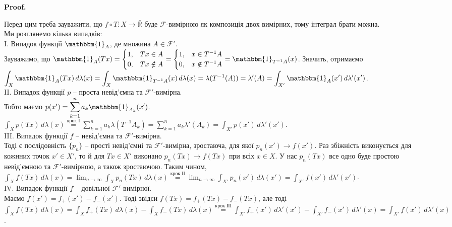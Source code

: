 \documentclass[a4paper, 10pt]{article}
\makeatletter
\theoremstyle{theoremdd}
\renewenvironment{proof}[1][Proof.\\]{\par
\pushQED{\hfill \qed}%
\normalfont \topsep6\p@\@plus6\p@\relax
\trivlist
\item\relax
{\bfseries
#1\@addpunct{.}}\hspace\labelsep\ignorespaces
}{%
\popQED\endtrivlist\@endpefalse
}
\makeatother
\begin{document}
\begin{proof}
Перед цим треба зауважити, що $f \circ T \colon X \to \bar{\mathbb{R}}$ буде $\mathcal{F}$-вимірною як композиція двох вимірних, тому інтеграл брати можна.\\
Ми розглянемо кілька випадків:\\
I. Випадок функції $\mathbbm{1}_A$, де множина $A \in \mathcal{F}'$.\\
Зауважимо, що $\mathbbm{1}_A(Tx) = \begin{cases} 1, & Tx \in A \\ 0, & Tx \notin A \end{cases} = \begin{cases} 1, & x \in T^{-1}A \\ 0, & x \notin T^{-1}A \end{cases} = \mathbbm{1}_{T^{-1}A}(x)$. Значить, отримаємо \\
$\displaystyle\int_X \mathbbm{1}_{A}(Tx)\,d\lambda(x) = \int_X \mathbbm{1}_{T^{-1}A}(x)\,d\lambda(x) = \lambda(T^{-1}(A)) = \lambda'(A) = \int_{X'} \mathbbm{1}_A(x')\,d\lambda'(x')$.
\bigskip \\
II. Випадок функції $p$ -- проста невід'ємна та $\mathcal{F}'$-вимірна.\\
Тобто маємо $p(x') = \displaystyle\sum_{k=1}^n a_k \mathbbm{1}_{A_k}(x')$.\\
$\displaystyle\int_X p(Tx)\,d\lambda(x) \overset{\text{крок І}}{=} \sum_{k=1}^n a_k \lambda(T^{-1}A_k) = \sum_{k=1}^n a_k \lambda'(A_k) = \int_{X'} p(x')\,d\lambda'(x')$.
\bigskip \\
III. Випадок функції $f$ -- невід'ємна та $\mathcal{F}'$-вимірна.\\
Тоді є послідовність $\{p_n\}$ -- прості невід'ємні та $\mathcal{F}'$-вимірна, зростаюча, для якої $p_n(x') \to f(x')$. Раз збіжність виконується для кожнних точок $x' \in X'$, то й для $Tx \in X'$ виконано $p_n(Tx) \to f(Tx)$ при всіх $x \in X$. У нас $p_n(Tx)$ все одно буде простою невід'ємною та $\mathcal{F}'$-вимірною, а також зростаючою. Таким чином,\\
$\displaystyle\int_X f(Tx)\,d\lambda(x) = \lim_{n \to \infty} \int_X p_n(Tx)\,d\lambda(x) \overset{\text{крок ІІ}}{=} \lim_{n \to \infty} \int_{X'} p_n(x')\,d\lambda(x') = \int_{X'} f(x')\,d\lambda'(x')$.
\bigskip \\
IV. Випадок функції $f$ -- довільної $\mathcal{F}'$-вимірної.\\
Маємо $f(x') = f_+(x') - f_-(x')$. Тоді звідси $f(Tx) = f_+(Tx) - f_-(Tx)$, але тоді\\
$\displaystyle\int_X f(Tx)\,d\lambda(x) = \int_X f_+(Tx)\,d\lambda(x) - \int_X f_-(Tx)\,d\lambda(x) \overset{\text{крок ІІІ}}{=} \int_{X'} f_+(x')\,d\lambda'(x') - \int_{X'}f_-(x')\,d\lambda'(x) = \int_{X'}f(x')\,d\lambda'(x)$.
\end{proof}
\newpage
\end{document}
